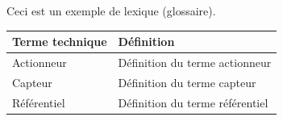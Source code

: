 Ceci est un exemple de lexique (glossaire).

\begin{center}
\begin{tabular}{ll}
\toprule
\textbf{Terme technique} & \textbf{Définition} \\ \midrule
Actionneur  & Définition du terme actionneur \\
Capteur     & Définition du terme capteur \\
Référentiel & Définition du terme référentiel \\
\bottomrule
\end{tabular}
\end{center}
